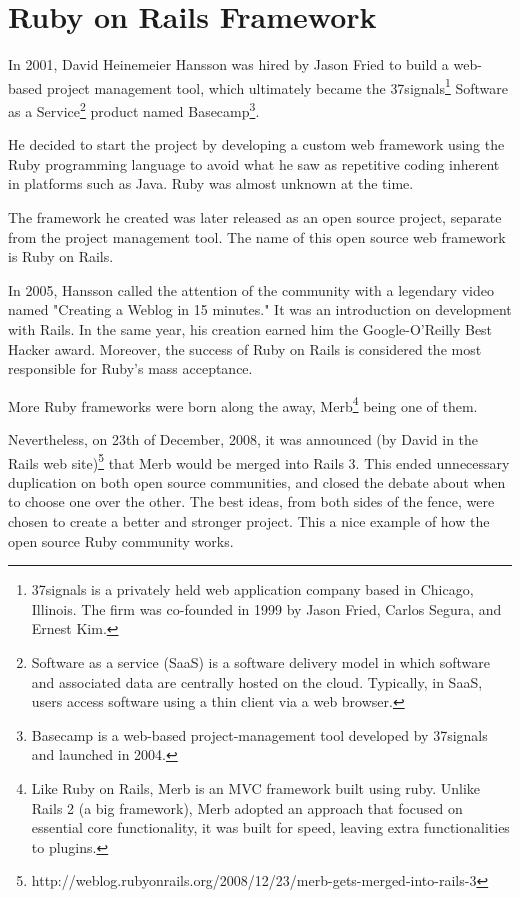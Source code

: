 \section{Ruby on Rails Framework} 
In 2001, David Heinemeier Hansson was hired by Jason Fried to build a web-based project management tool, 
which ultimately became the 
\textsf{37signals}\footnote{
  37signals is a privately held web application company based in Chicago, Illinois. 
  The firm was co-founded in 1999 by Jason Fried, Carlos Segura, and Ernest Kim.
}
\textsf{Software as a Service}\footnote{
 Software as a service (SaaS) is a software delivery model in which software and associated data are centrally hosted on the cloud.
 Typically, in SaaS, users access software using a thin client via a web browser.
}  
product named 
\textsf{Basecamp}\footnote{
  Basecamp is a web-based project-management tool developed by 37signals and launched in 2004.
}.

He decided to start the project by developing a custom web framework using the Ruby programming language
to avoid what he saw as repetitive coding inherent in platforms such as Java.
Ruby was almost unknown at the time.

The framework he created was later released as an open source project, separate from the project management tool. 
The name of this open source web framework is Ruby on Rails.

In 2005, Hansson called the attention of the community with a legendary video named "Creating a Weblog in 15 minutes." 
It was an introduction on development with Rails.
In the same year, his creation earned him the Google-O'Reilly Best Hacker award.
Moreover, the success of Ruby on Rails is considered the most responsible for Ruby's mass acceptance.

More Ruby frameworks were born along the away, 
\textsf{Merb}\footnote{
 Like Ruby on Rails, Merb is an MVC framework built using ruby.
 Unlike Rails 2 (a big framework), Merb adopted an approach that focused on essential core functionality, 
 it was built for speed, leaving extra functionalities to plugins.
}
being one of them.

Nevertheless, on 23th of December, 2008, it was announced
\textsf{(by David in the Rails web site)}\footnote{
 http://weblog.rubyonrails.org/2008/12/23/merb-gets-merged-into-rails-3
}
that Merb would be merged into Rails 3.
This ended unnecessary duplication on both open source communities, 
and closed the debate about when to choose one over the other.
The best ideas, from both sides of the fence, were chosen to create a better and stronger project.
This a nice example of how the open source Ruby community works. 

